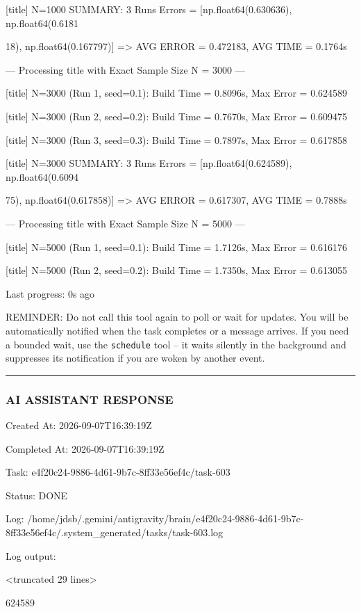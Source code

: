\documentclass[11pt,a4paper]{article}
\begin{document}
[title] N=1000 SUMMARY: 3 Runs Errors = [np.float64(0.630636), np.float64(0.6181

18), np.float64(0.167797)] => AVG ERROR = 0.472183, AVG TIME = 0.1764s

--- Processing title with Exact Sample Size N = 3000 ---

[title] N=3000 (Run 1, seed=0.1): Build Time = 0.8096s, Max Error = 0.624589

[title] N=3000 (Run 2, seed=0.2): Build Time = 0.7670s, Max Error = 0.609475

[title] N=3000 (Run 3, seed=0.3): Build Time = 0.7897s, Max Error = 0.617858

[title] N=3000 SUMMARY: 3 Runs Errors = [np.float64(0.624589), np.float64(0.6094

75), np.float64(0.617858)] => AVG ERROR = 0.617307, AVG TIME = 0.7888s

--- Processing title with Exact Sample Size N = 5000 ---

[title] N=5000 (Run 1, seed=0.1): Build Time = 1.7126s, Max Error = 0.616176

[title] N=5000 (Run 2, seed=0.2): Build Time = 1.7350s, Max Error = 0.613055


Last progress: 0s ago



REMINDER: Do not call this tool again to poll or wait for updates. You will be automatically notified when the task completes or a message arrives. If you need a bounded wait, use the \texttt{schedule} tool -- it waits silently in the background and suppresses its notification if you are woken by another event.


\hrule

\subsubsection{AI ASSISTANT RESPONSE}

Created At: 2026-09-07T16:39:19Z

Completed At: 2026-09-07T16:39:19Z

Task: e4f20c24-9886-4d61-9b7c-8ff33e56ef4c/task-603

Status: DONE

Log: /home/jdsb/.gemini/antigravity/brain/e4f20c24-9886-4d61-9b7c-8ff33e56ef4c/.system\_generated/tasks/task-603.log

Log output:

<truncated 29 lines>

624589
\end{document}
